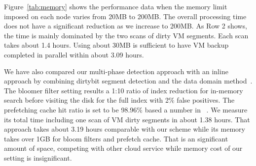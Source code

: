 Figure~\ref{tab:memory} shows the performance data when 
the memory limit imposed on each node varies  from 20MB to 200MB.
The overall processing time does not have a significant reduction as we increase to 200MB.
As Row 2 shows, the time is mainly dominated by  the two scans of dirty VM segments.
Each scan takes about 1.4 hours.
Using about 30MB is sufficient to have VM backup completed in parallel 
within about 3.09 hours.



We have also compared our multi-phase detection approach with an inline approach by combining
dirtybit segment  detection and  the data domain method~\cite{bottleneck08}. 
The bloomer filter setting  results a 1:10 ratio of index reduction for in-memory search before visiting
the disk for the full index with 2\% false positives. The prefetching cache hit ratio is set to be 98.96\% based
a number in ~\cite{bottleneck08}.
We measure its  total time including one scan of VM dirty segments in about 1.38 hours.
That approach takes about 3.19 hours comparable with our scheme while its memory takes
over 1GB for bloom filters and prefetch cache. That is an significant amount of space,
competing with other cloud service while memory cost of our setting is  insignificant.
 
